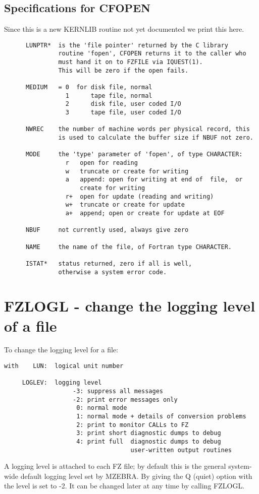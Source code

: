 \subsection*{Specifications for CFOPEN}

Since this is a new KERNLIB routine not yet documented we print this
here.

\begin{verbatim}
      LUNPTR*  is the 'file pointer' returned by the C library
               routine 'fopen', CFOPEN returns it to the caller who
               must hand it on to FZFILE via IQUEST(1).
               This will be zero if the open fails.

      MEDIUM   = 0  for disk file, normal
                 1      tape file, normal
                 2      disk file, user coded I/O
                 3      tape file, user coded I/O

      NWREC    the number of machine words per physical record, this
               is used to calculate the buffer size if NBUF not zero.

      MODE     the 'type' parameter of 'fopen', of type CHARACTER:
                 r   open for reading
                 w   truncate or create for writing
                 a   append: open for writing at end of  file,  or
                     create for writing
                 r+  open for update (reading and writing)
                 w+  truncate or create for update
                 a+  append; open or create for update at EOF

      NBUF     not currently used, always give zero

      NAME     the name of the file, of Fortran type CHARACTER.

      ISTAT*   status returned, zero if all is well,
               otherwise a system error code.
\end{verbatim}

\section{FZLOGL - change the logging level of a file}

To change the logging level for a file:

\begin{verbatim}
with    LUN:  logical unit number

     LOGLEV:  logging level
                   -3: suppress all messages
                   -2: print error messages only
                    0: normal mode
                    1: normal mode + details of conversion problems
                    2: print to monitor CALLs to FZ
                    3: print short diagnostic dumps to debug
                    4: print full  diagnostic dumps to debug
                                   user-written output routines
\end{verbatim}
A logging level is attached to each FZ file;
by default this is the general system-wide default logging level
set by MZEBRA.
By giving the Q (quiet) option with  the level is set to -2.
It can be changed later at any time by calling FZLOGL.

